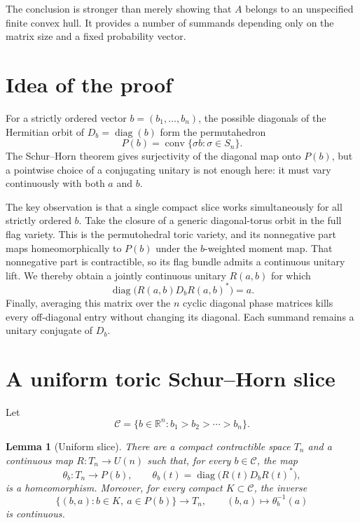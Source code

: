 \documentclass[11pt]{article}
\newtheorem{lemma}{Lemma}
\newcommand{\R}{\mathbb R}
\newcommand{\diag}{\operatorname{diag}}
\newcommand{\conv}{\operatorname{conv}}
\begin{document}
The conclusion is stronger than merely showing that $A$ belongs to an
unspecified finite convex hull.  It provides a number of summands depending
only on the matrix size and a fixed probability vector.

\section{Idea of the proof}

For a strictly ordered vector $b=(b_1,\ldots,b_n)$, the possible diagonals of
the Hermitian orbit of $D_b=\diag(b)$ form the permutahedron
\[
                    P(b)=\conv\{\sigma b:\sigma\in S_n\}.
\]
The Schur--Horn theorem gives surjectivity of the diagonal map onto $P(b)$,
but a pointwise choice of a conjugating unitary is not enough here: it must
vary continuously with both $a$ and $b$.

The key observation is that a single compact slice works simultaneously for
all strictly ordered $b$.  Take the closure of a generic diagonal-torus orbit
in the full flag variety.  This is the permutohedral toric variety, and its
nonnegative part maps homeomorphically to $P(b)$ under the $b$-weighted moment
map.  That nonnegative part is contractible, so its flag bundle admits a
continuous unitary lift.  We thereby obtain a jointly continuous unitary
$R(a,b)$ for which
\[
             \diag\bigl(R(a,b)D_bR(a,b)^*\bigr)=a.
\]
Finally, averaging this matrix over the $n$ cyclic diagonal phase matrices
kills every off-diagonal entry without changing its diagonal.  Each summand
remains a unitary conjugate of $D_b$.

\section{A uniform toric Schur--Horn slice}

Let
\[
       \mathcal C=\{b\in\R^n:b_1>b_2>\cdots>b_n\}.
\]

\begin{lemma}[Uniform slice]\label{lem:slice}
There are a compact contractible space $T_n$ and a continuous map
$R:T_n\to U(n)$ such that, for every $b\in\mathcal C$, the map
\[
 \theta_b:T_n\longrightarrow P(b),\qquad
 \theta_b(t)=\diag\bigl(R(t)D_bR(t)^*\bigr),
\]
is a homeomorphism.  Moreover, for every compact $K\subset\mathcal C$, the
inverse
\[
 \{(b,a):b\in K,\ a\in P(b)\}\longrightarrow T_n,
 \qquad (b,a)\longmapsto\theta_b^{-1}(a)
\]
is continuous.
\end{lemma}
\end{document}
